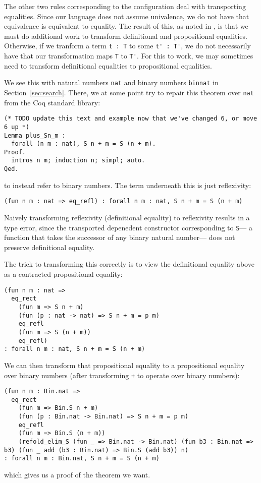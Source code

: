 The other two rules corresponding to the configuration deal with transporting equalities.
Since our language does not assume univalence, we do not have that equivalence is equivalent to equality.
The result of this, as noted in \citet{tabareau2019marriage},
is that we must do additional work to transform definitional and propositional equalities.
Otherwise, if we tranform a term \lstinline{t : T} to some \lstinline{t' : T'}, we do not necessarily
have that our transformation maps \lstinline{T} to \lstinline{T'}.
For this to work, we may sometimes need to transform definitional equalities to propositional equalities.

We see this with natural numbers \lstinline{nat} and binary numbers \lstinline{binnat}
in Section~\ref{sec:search}.
There, we at some point try to repair this theorem over \lstinline{nat} from the Coq standard library:

\begin{lstlisting}
(* TODO update this text and example now that we've changed 6, or move 6 up *)
Lemma plus_Sn_m :
  forall (n m : nat), S n + m = S (n + m).
Proof.
  intros n m; induction n; simpl; auto.
Qed.
\end{lstlisting}
to instead refer to binary numbers.
The term underneath this is just reflexivity:

\begin{lstlisting}
(fun n m : nat => eq_refl) : forall n m : nat, S n + m = S (n + m)
\end{lstlisting}
Naively transforming reflexivity (definitional equality) to reflexivity results in a type error,
since the transported depenedent constructor corresponding to \lstinline{S}---
a function that takes the successor of any binary natural number---
does not preserve definitional equality.

The trick to transforming this correctly is to view the definitional equality above as a contracted propositional equality:

\begin{lstlisting}
(fun n m : nat =>
  eq_rect
    (fun m => S n + m)
    (fun (p : nat -> nat) => S n + m = p m)
    eq_refl
    (fun m => S (n + m))
    eq_refl)
: forall n m : nat, S n + m = S (n + m)
\end{lstlisting}
We can then transform that propositional equality to a propositional equality over binary numbers (after transforming \lstinline{+} to operate
over binary numbers):

\begin{lstlisting}
(fun n m : Bin.nat =>
  eq_rect
    (fun m => Bin.S n + m)
    (fun (p : Bin.nat -> Bin.nat) => S n + m = p m)
    eq_refl
    (fun m => Bin.S (n + m))
    (refold_elim_S (fun _ => Bin.nat -> Bin.nat) (fun b3 : Bin.nat => b3) (fun _ add (b3 : Bin.nat) => Bin.S (add b3)) n)
: forall n m : Bin.nat, S n + m = S (n + m)
\end{lstlisting}
which gives us a proof of the theorem we want.

